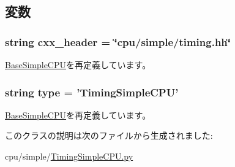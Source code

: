 \subsection{変数}
\hypertarget{classTimingSimpleCPU_1_1TimingSimpleCPU_a17da7064bc5c518791f0c891eff05fda}{
\subsubsection[{cxx\_\-header}]{\setlength{\rightskip}{0pt plus 5cm}string {\bf cxx\_\-header} = \char`\"{}cpu/simple/timing.hh\char`\"{}}}
\label{classTimingSimpleCPU_1_1TimingSimpleCPU_a17da7064bc5c518791f0c891eff05fda}


\hyperlink{classBaseSimpleCPU_1_1BaseSimpleCPU_a17da7064bc5c518791f0c891eff05fda}{BaseSimpleCPU}を再定義しています。\hypertarget{classTimingSimpleCPU_1_1TimingSimpleCPU_acce15679d830831b0bbe8ebc2a60b2ca}{
\subsubsection[{type}]{\setlength{\rightskip}{0pt plus 5cm}string {\bf type} = '{\bf TimingSimpleCPU}'}}
\label{classTimingSimpleCPU_1_1TimingSimpleCPU_acce15679d830831b0bbe8ebc2a60b2ca}


\hyperlink{classBaseSimpleCPU_1_1BaseSimpleCPU_acce15679d830831b0bbe8ebc2a60b2ca}{BaseSimpleCPU}を再定義しています。

このクラスの説明は次のファイルから生成されました:\begin{DoxyCompactItemize}
\item 
cpu/simple/\hyperlink{TimingSimpleCPU_8py}{TimingSimpleCPU.py}\end{DoxyCompactItemize}
